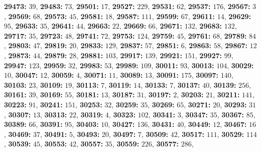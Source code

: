 \textsf{\bfseries 29473:} $39$, \textsf{\bfseries 29483:} $73$, \textsf{\bfseries 29501:} $17$, \textsf{\bfseries 29527:} $229$, \textsf{\bfseries 29531:} $62$, \textsf{\bfseries 29537:} $176$, \textsf{\bfseries 29567:} $3$, \textsf{\bfseries 29569:} $68$, \textsf{\bfseries 29573:} $45$, \textsf{\bfseries 29581:} $18$, \textsf{\bfseries 29587:} $111$, \textsf{\bfseries 29599:} $67$, \textsf{\bfseries 29611:} $14$, \textsf{\bfseries 29629:} $95$, \textsf{\bfseries 29633:} $35$, \textsf{\bfseries 29641:} $44$, \textsf{\bfseries 29663:} $22$, \textsf{\bfseries 29669:} $66$, \textsf{\bfseries 29671:} $132$, \textsf{\bfseries 29683:} $132$, \textsf{\bfseries 29717:} $35$, \textsf{\bfseries 29723:} $48$, \textsf{\bfseries 29741:} $72$, \textsf{\bfseries 29753:} $124$, \textsf{\bfseries 29759:} $45$, \textsf{\bfseries 29761:} $68$, \textsf{\bfseries 29789:} $84$, \textsf{\bfseries 29803:} $47$, \textsf{\bfseries 29819:} $20$, \textsf{\bfseries 29833:} $129$, \textsf{\bfseries 29837:} $57$, \textsf{\bfseries 29851:} $6$, \textsf{\bfseries 29863:} $58$, \textsf{\bfseries 29867:} $12$, \textsf{\bfseries 29873:} $44$, \textsf{\bfseries 29879:} $28$, \textsf{\bfseries 29881:} $103$, \textsf{\bfseries 29917:} $139$, \textsf{\bfseries 29921:} $151$, \textsf{\bfseries 29927:} $99$, \textsf{\bfseries 29947:} $123$, \textsf{\bfseries 29959:} $32$, \textsf{\bfseries 29983:} $53$, \textsf{\bfseries 29989:} $109$, \textsf{\bfseries 30011:} $93$, \textsf{\bfseries 30013:} $104$, \textsf{\bfseries 30029:} $10$, \textsf{\bfseries 30047:} $12$, \textsf{\bfseries 30059:} $4$, \textsf{\bfseries 30071:} $11$, \textsf{\bfseries 30089:} $13$, \textsf{\bfseries 30091:} $175$, \textsf{\bfseries 30097:} $140$, \textsf{\bfseries 30103:} $23$, \textsf{\bfseries 30109:} $19$, \textsf{\bfseries 30113:} $7$, \textsf{\bfseries 30119:} $14$, \textsf{\bfseries 30133:} $7$, \textsf{\bfseries 30137:} $40$, \textsf{\bfseries 30139:} $256$, \textsf{\bfseries 30161:} $39$, \textsf{\bfseries 30169:} $55$, \textsf{\bfseries 30181:} $13$, \textsf{\bfseries 30187:} $31$, \textsf{\bfseries 30197:} $2$, \textsf{\bfseries 30203:} $21$, \textsf{\bfseries 30211:} $141$, \textsf{\bfseries 30223:} $91$, \textsf{\bfseries 30241:} $151$, \textsf{\bfseries 30253:} $32$, \textsf{\bfseries 30259:} $35$, \textsf{\bfseries 30269:} $65$, \textsf{\bfseries 30271:} $20$, \textsf{\bfseries 30293:} $31$, \textsf{\bfseries 30307:} $13$, \textsf{\bfseries 30313:} $22$, \textsf{\bfseries 30319:} $4$, \textsf{\bfseries 30323:} $102$, \textsf{\bfseries 30341:} $3$, \textsf{\bfseries 30347:} $35$, \textsf{\bfseries 30367:} $85$, \textsf{\bfseries 30389:} $66$, \textsf{\bfseries 30391:} $95$, \textsf{\bfseries 30403:} $10$, \textsf{\bfseries 30427:} $136$, \textsf{\bfseries 30431:} $40$, \textsf{\bfseries 30449:} $12$, \textsf{\bfseries 30467:} $16$, \textsf{\bfseries 30469:} $37$, \textsf{\bfseries 30491:} $5$, \textsf{\bfseries 30493:} $20$, \textsf{\bfseries 30497:} $7$, \textsf{\bfseries 30509:} $42$, \textsf{\bfseries 30517:} $111$, \textsf{\bfseries 30529:} $114$, \textsf{\bfseries 30539:} $45$, \textsf{\bfseries 30553:} $42$, \textsf{\bfseries 30557:} $35$, \textsf{\bfseries 30559:} $226$, \textsf{\bfseries 30577:} $286$, 
